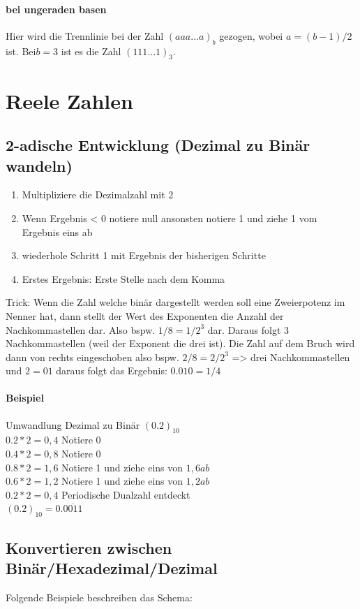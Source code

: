 \documentclass[a4paper]{article}
\begin{document}
		\paragraph{bei ungeraden basen}
		Hier wird die Trennlinie bei der Zahl $(aaa...a)_b$ gezogen, wobei $a=(b-1)/2$ ist. Bei$ b=3$ ist es die Zahl $(111...1)_3$.
	
\section{Reele Zahlen}
	\subsection{2-adische Entwicklung (Dezimal zu Binär wandeln)}
		\begin{enumerate} 
			\item Multipliziere die Dezimalzahl mit 2
			\item Wenn Ergebnis < 0 notiere null ansonsten notiere 1 und ziehe 1 vom Ergebnis eins ab
			\item wiederhole Schritt 1 mit Ergebnis der bisherigen Schritte
			\item Erstes Ergebnis: Erste Stelle nach dem Komma 
		\end{enumerate}
		Trick: Wenn die Zahl welche binär dargestellt werden soll eine Zweierpotenz im Nenner hat, dann stellt der Wert des Exponenten die Anzahl der Nachkommastellen dar. Also bspw. $ 1/8 = 1/2^3 $ dar. Daraus folgt 3 Nachkommastellen (weil der Exponent die drei ist). Die Zahl auf dem Bruch wird dann von rechts eingeschoben also bspw. $2/8 = 2/2^3 $ => drei Nachkommastellen und $ 2 = 01 $ daraus folgt das Ergebnis: $ 0.010 = 1/4$
		\paragraph{Beispiel} Umwandlung Dezimal zu Binär $(0.2)_{10}$\\
			$0.2 * 2 = 0,4 $ Notiere 0\\
			$0.4 * 2 = 0,8 $ Notiere 0\\
			$0.8 * 2 = 1,6 $ Notiere 1 und ziehe eins von $1,6 ab$\\
			$0.6 * 2 = 1,2 $ Notiere 1 und ziehe eins von $1,2 ab$\\
			$0.2 * 2 = 0,4 $ Periodische Dualzahl entdeckt\\
			$(0.2)_{10} = 0.\overline{0011}$
		
		
	\subsection{Konvertieren zwischen Binär/Hexadezimal/Dezimal}
		Folgende Beispiele beschreiben das Schema:
		
\end{document}
